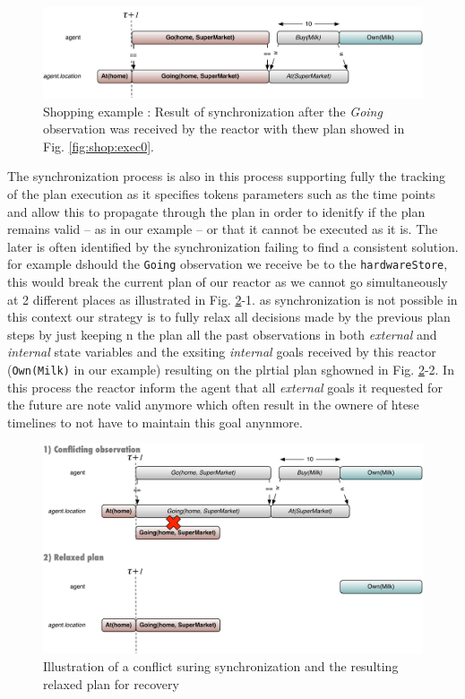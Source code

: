 \begin{figure}[!htb]
  \centering
  \includegraphics[width=0.7\columnwidth]{figs/shoping_exec_t1}
  \caption{Shopping example : Result of synchronization after the {\em
      Going} observation was received by the reactor with thew plan
    showed in Fig. \ref{fig:shop:exec0}.}
  \label{fig:shop:exec1}
\end{figure}

The synchronization process is also in this process supporting fully
the tracking of the plan execution as it specifies tokens parameters
such as the time points and allow this to propagate through the plan
in order to idenitfy if the plan remains valid -- as in our example --
or that it cannot be executed as it is. The later is often identified
by the synchronization failing to find a consistent solution. for
example dshould the \texttt{Going} observation we receive be to the
\texttt{hardwareStore}, this would break the current plan of our
reactor as we cannot go simultaneously at 2 different places as
illustrated in Fig. \ref{fig:shop:relax}-1. as synchronization is not
possible in this context our strategy is to fully relax all decisions
made by the previous plan steps by just keeping n the plan all the
past observations in both {\em external} and {\em internal} state
variables and the exsiting {\em internal} goals received by this
reactor (\texttt{Own(Milk)} in our example) resulting on the plrtial
plan sghowned in Fig. \ref{fig:shop:relax}-2. In this process the
reactor inform the agent that all {\em external} goals it requested
for the future are note valid anymore which often result in the ownere
of htese timelines to not have to maintain this goal anynmore.

\begin{figure}[!htbp]
  \centering
  \includegraphics[width=0.7\columnwidth]{figs/shoping_exec_relax}  
  \caption{Illustration of a conflict suring synchronization and the
    resulting relaxed plan for recovery} 
  \label{fig:shop:relax}
\end{figure}

